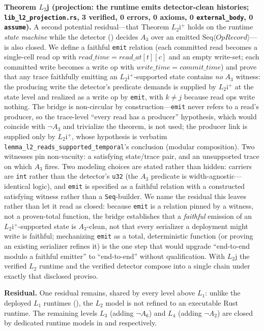 \documentclass[journal,compsoc,10pt]{IEEEtran}
\theoremstyle{definition}
\theoremstyle{remark}
\begin{document}
\medskip
\noindent\textbf{Theorem $L_2$j (projection: the runtime emits detector-clean
histories; \texttt{lib\_l2\_projection.rs}, 3 verified, 0 errors, 0 axioms, 0
\texttt{external\_body}, 0 \texttt{assume}).}
A second potential residual---that Theorem $L_2$i$^+$ holds on the
runtime \emph{state machine} while the detector ()
decides $A_3$ over an emitted
$\mathrm{Seq}\langle\mathit{OpRecord}\rangle$---is also closed. We define a
faithful \texttt{emit} relation (each committed read becomes a single-cell
read op with $\mathit{read\_time}=\mathit{read\_at}[t][c]$ and an empty
write-set; each committed write becomes a write op with
$\mathit{write\_time}=\mathit{commit\_time}$) and prove that any trace
faithfully emitting an $L_2$i$^+$-supported state contains \emph{no} $A_3$
witness: the producing write the detector's predicate demands is supplied by
$L_2$i$^+$ at the state level and realized as a write op by \texttt{emit}, with
$k\neq j$ because read ops write nothing. The bridge is non-circular by
construction---\texttt{emit} never refers to a read's producer, so the
trace-level ``every read has a producer'' hypothesis, which would coincide
with $\neg A_3$ and trivialize the theorem, is not used; the producer link is
supplied only by $L_2$i$^+$, whose hypothesis is verbatim
\texttt{lemma\_l2\_reads\_supported\_temporal}'s conclusion (modular
composition). Two witnesses pin non-vacuity: a satisfying state/trace pair, and
an unsupported trace on which $A_3$ fires. Two modeling choices are stated
rather than hidden: carriers are \texttt{int} rather than the detector's
\texttt{u32} (the $A_3$ predicate is width-agnostic---identical logic), and
\texttt{emit} is specified as a faithful relation with a constructed satisfying
witness rather than a \texttt{Seq}-builder. We name the residual this leaves
rather than let it read as closed: because \texttt{emit} is a relation pinned
by a witness, not a proven-total function, the bridge establishes that a
\emph{faithful} emission of an $L_2$i$^+$-supported state is $A_3$-clean, not
that every serializer a deployment might write is faithful; mechanizing
\texttt{emit} as a total, deterministic function (or proving an existing
serializer refines it) is the one step that would upgrade ``end-to-end modulo
a faithful emitter'' to ``end-to-end'' without qualification. With $L_2$j the
verified $L_2$ runtime and the verified detector compose into a single chain
under exactly that disclosed proviso.

\medskip
\noindent\textbf{Residual.}
One residual remains, shared by every level above $L_1$: unlike the deployed
$L_1$ runtimes (), the $L_2$ model is not refined to
an executable Rust runtime. The remaining
levels $L_3$ (adding $\neg A_6$) and $L_4$ (adding $\neg A_2$) are
closed by dedicated runtime models in  and
 respectively.
\end{document}
